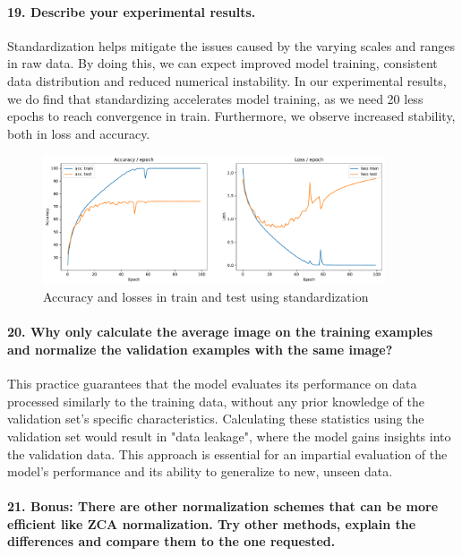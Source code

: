 \paragraph{19. Describe your experimental results.}

Standardization helps mitigate the issues caused by the varying scales and ranges in raw data. By doing this, we can expect improved model training, consistent data distribution and reduced numerical instability. In our experimental results, we do find that standardizing accelerates model training, as we need 20 less epochs to reach convergence in train. Furthermore, we observe increased stability, both in loss and accuracy.

\begin{figure}[H]
    \centering
    \includegraphics*[width=0.9\textwidth]{figs/CNN/standardization.pdf}
    \caption{Accuracy and losses in train and test using standardization}
    \label{fig:standardization}
\end{figure}

\paragraph{20. Why only calculate the average image on the training examples and normalize the validation examples with the same image?}
This practice guarantees that the model evaluates its performance on data processed similarly to the training data, without any prior knowledge of the validation set's specific characteristics. Calculating these statistics using the validation set would result in "data leakage", where the model gains insights into the validation data. This approach is essential for an impartial evaluation of the model's performance and its ability to generalize to new, unseen data.

\paragraph{21. Bonus: There are other normalization schemes that can be more efficient like ZCA normalization. Try other methods, explain the differences and compare them to the one requested.}

